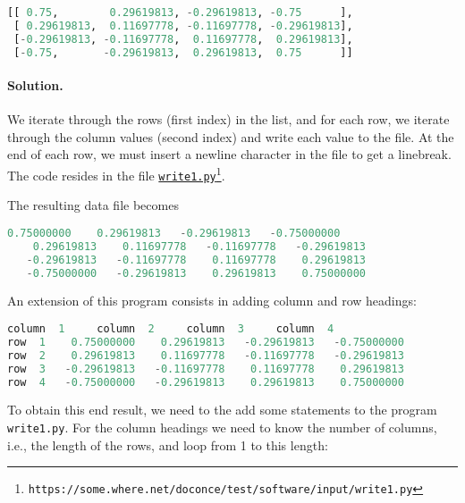 \documentclass[graybox,sectrefs,envcountresetchap,open=right,final]{svmonodo}
\begin{document}
\begin{lstlisting}[language=Python,style=simple,xleftmargin=2mm]
[[ 0.75,        0.29619813, -0.29619813, -0.75      ],
 [ 0.29619813,  0.11697778, -0.11697778, -0.29619813],
 [-0.29619813, -0.11697778,  0.11697778,  0.29619813],
 [-0.75,       -0.29619813,  0.29619813,  0.75      ]]

\end{lstlisting}


\paragraph{Solution.}
We iterate through the rows (first index) in the list, and for each row,
we iterate through the column values (second index)
and write each value to the file.
At the end of each row, we must insert a newline character in the file to get
a linebreak. The code resides in the file \href{{https://some.where.net/doconce/test/software/input/write1.py}}{\nolinkurl{write1.py}\footnote{\texttt{https://some.where.net/doconce/test/software/input/write1.py}}}.

The resulting data file becomes






\begin{lstlisting}[language=Python,style=simple,xleftmargin=2mm]
    0.75000000    0.29619813   -0.29619813   -0.75000000
    0.29619813    0.11697778   -0.11697778   -0.29619813
   -0.29619813   -0.11697778    0.11697778    0.29619813
   -0.75000000   -0.29619813    0.29619813    0.75000000

\end{lstlisting}


An extension of this program consists in adding column and row headings:







\begin{lstlisting}[language=Python,style=simple,xleftmargin=2mm]
           column  1     column  2     column  3     column  4
row  1    0.75000000    0.29619813   -0.29619813   -0.75000000
row  2    0.29619813    0.11697778   -0.11697778   -0.29619813
row  3   -0.29619813   -0.11697778    0.11697778    0.29619813
row  4   -0.75000000   -0.29619813    0.29619813    0.75000000

\end{lstlisting}

To obtain this end result, we need to the add some statements to
the program \texttt{write1.py}. For the column headings we need
to know the number of columns, i.e., the length of the rows,
and loop from 1 to this length:
\end{document}
